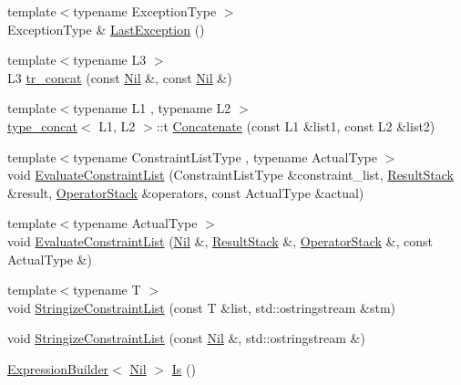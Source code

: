 \begin{DoxyCompactItemize}
\item 
{\footnotesize template$<$typename Exception\+Type $>$ }\\Exception\+Type \& \mbox{\hyperlink{namespacesnowhouse_a6093862b600733eb0d8124f053433fb6}{Last\+Exception}} ()
\item 
{\footnotesize template$<$typename L3 $>$ }\\L3 \mbox{\hyperlink{namespacesnowhouse_a95dc585af31f910717dd546909c8513a}{tr\+\_\+concat}} (const \mbox{\hyperlink{structsnowhouse_1_1Nil}{Nil}} \&, const \mbox{\hyperlink{structsnowhouse_1_1Nil}{Nil}} \&)
\item 
{\footnotesize template$<$typename L1 , typename L2 $>$ }\\\mbox{\hyperlink{structsnowhouse_1_1type__concat}{type\+\_\+concat}}$<$ L1, L2 $>$\+::t \mbox{\hyperlink{namespacesnowhouse_a458f016380e67dc5dff8e5ded8c87bd9}{Concatenate}} (const L1 \&list1, const L2 \&list2)
\item 
{\footnotesize template$<$typename Constraint\+List\+Type , typename Actual\+Type $>$ }\\void \mbox{\hyperlink{namespacesnowhouse_a1b09fb05d70181243b91194c3373352d}{Evaluate\+Constraint\+List}} (Constraint\+List\+Type \&constraint\+\_\+list, \mbox{\hyperlink{namespacesnowhouse_a719169b1315a13161c15f25e600a8f51}{Result\+Stack}} \&result, \mbox{\hyperlink{namespacesnowhouse_adcb10e215e6a4bbcb35722a9c7270fc6}{Operator\+Stack}} \&operators, const Actual\+Type \&actual)
\item 
{\footnotesize template$<$typename Actual\+Type $>$ }\\void \mbox{\hyperlink{namespacesnowhouse_a01bed343b418b0f747e41dee35669659}{Evaluate\+Constraint\+List}} (\mbox{\hyperlink{structsnowhouse_1_1Nil}{Nil}} \&, \mbox{\hyperlink{namespacesnowhouse_a719169b1315a13161c15f25e600a8f51}{Result\+Stack}} \&, \mbox{\hyperlink{namespacesnowhouse_adcb10e215e6a4bbcb35722a9c7270fc6}{Operator\+Stack}} \&, const Actual\+Type \&)
\item 
{\footnotesize template$<$typename T $>$ }\\void \mbox{\hyperlink{namespacesnowhouse_a51108113346d79224fd94701a0ac4a0f}{Stringize\+Constraint\+List}} (const T \&list, std\+::ostringstream \&stm)
\item 
void \mbox{\hyperlink{namespacesnowhouse_a085d20f5a6569245f33432e1d881d547}{Stringize\+Constraint\+List}} (const \mbox{\hyperlink{structsnowhouse_1_1Nil}{Nil}} \&, std\+::ostringstream \&)
\item 
\mbox{\hyperlink{structsnowhouse_1_1ExpressionBuilder}{Expression\+Builder}}$<$ \mbox{\hyperlink{structsnowhouse_1_1Nil}{Nil}} $>$ \mbox{\hyperlink{namespacesnowhouse_a93bfe2e092fb56b6554640d669ef2ee3}{Is}} ()

\end{DoxyCompactItemize}
